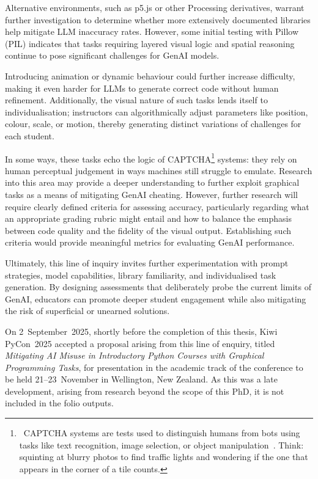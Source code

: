 Alternative environments, such as p5.js or other Processing derivatives, warrant further investigation to determine whether more extensively documented libraries help mitigate LLM inaccuracy rates. However, some initial testing with Pillow (PIL) indicates that tasks requiring layered visual logic and spatial reasoning continue to pose significant challenges for GenAI models.

Introducing animation or dynamic behaviour could further increase difficulty, making it even harder for LLMs to generate correct code without human refinement. Additionally, the visual nature of such tasks lends itself to individualisation; instructors can algorithmically adjust parameters like position, colour, scale, or motion, thereby generating distinct variations of challenges for each student.

In some ways, these tasks echo the logic of CAPTCHA\footnote{~CAPTCHA systems are tests used to distinguish humans from bots using tasks like text recognition, image selection, or object manipulation~\cite{guerar_gotta_2022}. Think: squinting at blurry photos to find traffic lights and wondering if the one that appears in the corner of a tile counts.} systems: they rely on human perceptual judgement in ways machines still struggle to emulate. Research into this area may provide a deeper understanding to further exploit graphical tasks as a means of mitigating GenAI cheating. However, further research will require clearly defined criteria for assessing accuracy, particularly regarding what an appropriate grading rubric might entail and how to balance the emphasis between code quality and the fidelity of the visual output. Establishing such criteria would provide meaningful metrics for evaluating GenAI performance.

Ultimately, this line of inquiry invites further experimentation with prompt strategies, model capabilities, library familiarity, and individualised task generation. By designing assessments that deliberately probe the current limits of GenAI, educators can promote deeper student engagement while also mitigating the risk of superficial or unearned solutions.

\begin{description}[labelwidth=3.5em, leftmargin=!, labelindent=0pt]
\item[\colorbox{black}{\textcolor{white}{NOTE}}] On 2~September~2025, shortly before the completion of this thesis, Kiwi PyCon~2025 accepted a proposal arising from this line of enquiry, titled \textit{Mitigating AI Misuse in Introductory Python Courses with Graphical Programming Tasks}, for presentation in the academic track of the conference to be held 21--23~November in Wellington, New Zealand. As this was a late development, arising from research beyond the scope of this PhD, it is not included in the folio outputs.
\end{description}
